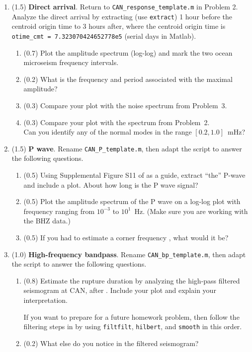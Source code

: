 \documentclass[11pt,titlepage,fleqn]{article}
\begin{document}
\begin{enumerate}
\item (1.5) {\bf Direct arrival}. 
Return to \verb+CAN_response_template.m+ in Problem 2.
Analyze the direct arrival by extracting (use \verb+extract+) 1 hour before the centroid origin time to 3 hours after, where the centroid origin time is \\ \verb+otime_cmt = 7.323070424652778e5+ (serial days in Matlab).

\begin{enumerate}
\item (0.7) Plot the amplitude spectrum (log-log) and mark the two ocean microseism frequency intervals.
\item (0.2) What is the frequency and period associated with the maximal amplitude?
\item (0.3) Compare your plot with the noise spectrum from Problem~3.
\item (0.3) Compare your plot with the spectrum from Problem~2. \\
Can you identify any of the normal modes in the range $[0.2,1.0]$~mHz?
\end{enumerate}


\pagebreak
\item (1.5) {\bf P wave}. Rename \verb+CAN_P_template.m+, then adapt the script to answer the following questions.
%
\begin{enumerate}
\item (0.5) Using Supplemental Figure S11 of \citet{Ammon2005} as a guide, extract ``the'' P-wave and include a plot. About how long is the P wave signal?
\item (0.5) Plot the amplitude spectrum of the P wave on a log-log plot with frequency ranging from $10^{-3}$ to $10^1$~Hz. (Make sure you are working with the BHZ data.)

\item (0.5) If you had to estimate a corner frequency \citep[][p.~267]{SteinWysession}, what would it be?
\end{enumerate}


\item (1.0) {\bf High-frequency bandpass}. Rename \verb+CAN_bp_template.m+, then adapt the script to answer the following questions.
%
\begin{enumerate}
\item (0.8) Estimate the rupture duration by analyzing the high-pass filtered seismogram at CAN, after \citet{Ni2005}. Include your plot and explain your interpretation.

If you want to prepare for a future homework problem, then follow the filtering steps in \citet{Ni2005} by using \verb+filtfilt+, \verb+hilbert+, and \verb+smooth+ in this order.

\item (0.2) What else do you notice in the filtered seismogram?
\end{enumerate}

\end{enumerate}
\end{document}
